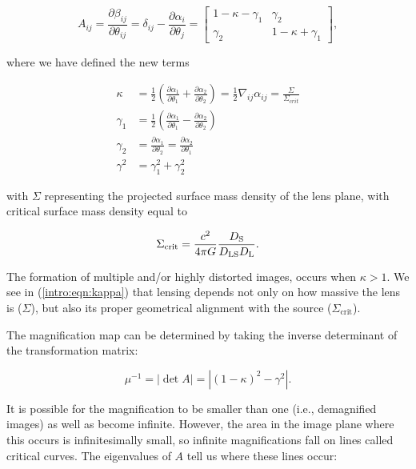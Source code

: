 \begin{equation}
A_{ij} = \frac{\partial \beta_{ij}}{\partial \theta_{ij}} = \delta_{ij} - \frac{\partial{\alpha_{i}}}{\partial{\theta_{j}}} = 
	\begin{bmatrix}
		1-\kappa-\gamma_1 & \gamma_2 \\
		\gamma_2 & 1-\kappa+\gamma_1
	\end{bmatrix},
\end{equation}

\noindent where we have defined the new terms

\begin{align}
\kappa &= \frac{1}{2} \left(\frac{\partial{\alpha_{1}}}{\partial{\theta_{1}}}+\frac{\partial{\alpha_{2}}}{\partial{\theta_{2}}}\right) = \frac{1}{2} \nabla_{ij} \alpha_{ij} = \frac{\Sigma}{\Sigma_{crit}} \label{intro:eqn:kappa} \\
\gamma_1 &= \frac{1}{2} \left(\frac{\partial{\alpha_{1}}}{\partial{\theta_{1}}}-\frac{\partial{\alpha_{2}}}{\partial{\theta_{2}}}\right) \\
\gamma_2 &= \frac{\partial{\alpha_{1}}}{\partial{\theta_{2}}} = \frac{\partial{\alpha_{2}}}{\partial{\theta_{1}}} \\
\gamma^2 &= \gamma_1^2 + \gamma_2^2
\end{align}

\noindent with $\Sigma$ representing the projected surface mass density of the lens plane, with critical surface mass density equal to

\begin{equation}
\Sigma_\mathrm{crit} = \frac{c^2}{4\pi G} \frac{D_\mathrm{S}}{D_\mathrm{LS}D_\mathrm{L}}.
\end{equation}

\noindent The formation of multiple and/or highly distorted images, occurs when $\kappa>1$. We see in (\ref{intro:eqn:kappa}) that lensing depends not only on how massive the lens is ($\Sigma$), but also its proper geometrical alignment with the source ($\Sigma_\mathrm{crit}$).

The magnification map can be determined by taking the inverse determinant of the transformation matrix:

\begin{equation}
\mu^{-1} = |\det A| = |(1-\kappa)^2 - \gamma^2|.
\end{equation}

\noindent It is possible for the magnification to be smaller than one (i.e., demagnified images) as well as become infinite. However, the area in the image plane where this occurs is infinitesimally small, so infinite magnifications fall on lines called critical curves. The eigenvalues of $A$ tell us where these lines occur:

